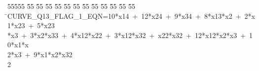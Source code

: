 %
%
\begin{tabbing}
55555 \= 55 \= 55 \= 55 \= 55 \= 55 \= 55 \= 55 \= 55 \= 55 \= 55 \= 55 \= 55 \= \>CURVE\_Q13\_FLAG\_1\_EQN=10*x14\ +\ 12*x24\ +\ 9*x34\ +\ 8*x13*x2\ +\ 2*x1*x23\ +\ 5*x23\\[0pt]
\>*x3\ +\ 3*x2*x33\ +\ 4*x12*x22\ +\ 3*x12*x32\ +\ x22*x32\ +\ 12*x12*x2*x3\ +\ 10*x1*x\\[0pt]
2*x3\ +\ 9*x1*x2*x32\\[0pt]
2\>\end{tabbing}
